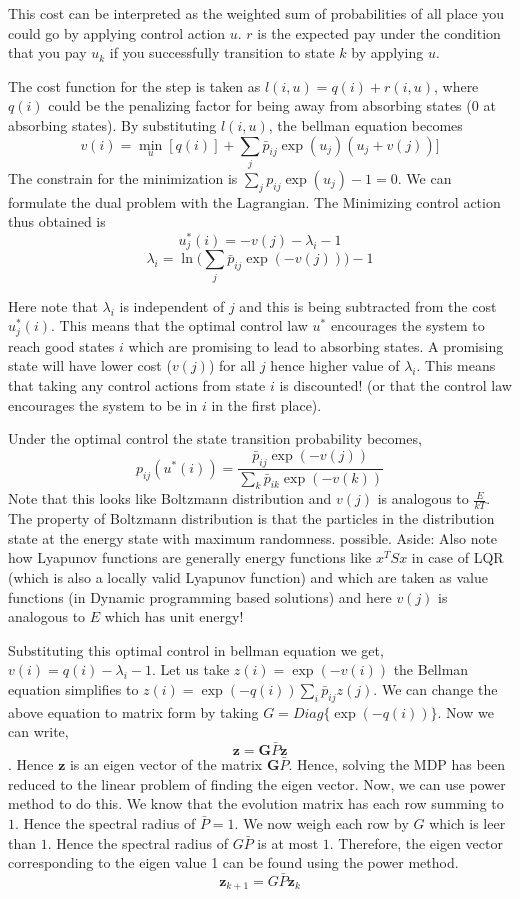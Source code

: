\documentclass{article}[11pt]
\begin{document}
This cost can be interpreted as the weighted sum of probabilities of all place you could go by applying control action $u$. $r$ is the expected pay under the condition that you pay $u_k$ if you successfully transition to state $k$ by applying $u$. 

The cost function for the step is taken as $l(i,u) = q(i) + r(i,u)$, where $q(i)$ could be the penalizing factor for being away from absorbing states ($0$ at absorbing states). By substituting $l(i,u)$, the bellman equation becomes $$v(i) = \min_u[q(i)] + \sum_j\bar{p}_{ij}\exp(u_j)(u_j+v(j))]$$ The constrain for the minimization is $\sum_j p_{ij}\exp(u_j) - 1 = 0$. We can formulate the dual problem with the Lagrangian. The Minimizing control action thus obtained is $$u^*_j(i) = -v(j)-\lambda_i-1$$ $$\lambda_i = \ln\Big(\sum_j\bar{p}_{ij}\exp(-v(j))\Big)-1$$

Here note that $\lambda_i$ is independent of $j$ and this is being subtracted from the cost $u^*_j(i)$. This means that the optimal control law $u^*$ encourages the system to reach good states $i$ which are promising to lead to absorbing states. A promising state will have lower cost ($v(j)$) for all $j$ hence higher value of $\lambda_i$. This means that taking any control actions from state $i$ is discounted! (or that the control law encourages the system to be in $i$ in the first place). 

Under the optimal control the state transition probability becomes, $$p_{ij}(u^*(i)) = \frac{\bar{p}_{ij}\exp(-v(j))}{\sum_k\bar{p}_{ik}\exp(-v(k))}$$ Note that this looks like Boltzmann distribution and $v(j)$ is analogous to $\frac{E}{kT}$. The property of Boltzmann distribution is that the particles in the distribution state at the energy state with maximum randomness.  possible. Aside: Also note how Lyapunov functions are generally energy functions like $x^TSx$ in case of LQR (which is also a locally valid Lyapunov function) and which are taken as value functions (in Dynamic programming based solutions) and here $v(j)$ is analogous to $E$ which has unit energy!

Substituting this optimal control in bellman equation we get, $v(i) = q(i) - \lambda_i - 1$. Let us take $z(i) = \exp(-v(i))$ the Bellman equation simplifies to $z(i) = \exp(-q(i))\sum_i\bar{p}_{ij}z(j)$. We can change the above equation to matrix form by taking $G = Diag\{ \exp(-q(i))\}$. Now we can write, $$\textbf{z}= \textbf{G}\bar{P}\textbf{z}$$. Hence $\textbf{z}$ is an eigen vector of the matrix $\textbf{G}\bar{P}$. Hence, solving the MDP has been reduced to the linear problem of finding the eigen vector. Now, we can use power method to do this. We know that the evolution matrix has each row summing to $1$. Hence the spectral radius of $\bar{P} = 1$. We now weigh each row by $G$ which is leer than $1$. Hence the spectral radius of $G\bar{P}$ is at most $1$. Therefore, the eigen vector corresponding to the eigen value 1 can be found using the power method. $$\textbf{z}_{k+1} = G\bar{P}\textbf{z}_k$$
\end{document}
